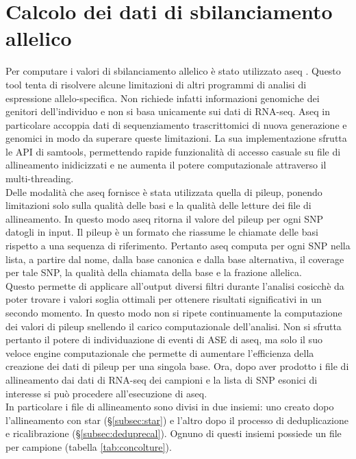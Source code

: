  \section{Calcolo dei dati di sbilanciamento allelico}
  \label{sec:aseq}
  Per computare i valori di sbilanciamento allelico \`e stato utilizzato aseq \cite{aseq}.
  Questo tool tenta di risolvere alcune limitazioni di altri programmi di analisi di espressione allelo-specifica.
  Non richiede infatti informazioni genomiche dei genitori dell'individuo e non si basa unicamente sui dati di RNA-seq.
  Aseq in particolare accoppia dati di sequenziamento trascrittomici di nuova generazione e genomici in modo da superare queste limitazioni.
  La sua implementazione sfrutta le API di samtools, permettendo rapide funzionalit\`a di accesso casuale su file di allineamento inidicizzati e ne aumenta il potere computazionale attraverso il multi-threading.\\
  Delle modalit\`a che aseq fornisce \`e stata utilizzata quella di pileup, ponendo limitazioni solo sulla qualit\`a delle basi e la qualit\`a delle letture dei file di allineamento.
  In questo modo aseq ritorna il valore del pileup per ogni SNP datogli in input.
  Il pileup \`e un formato che riassume le chiamate delle basi rispetto a una sequenza di riferimento.
  Pertanto aseq computa per ogni SNP nella lista, a partire dal nome, dalla base canonica e dalla base alternativa, il coverage per tale SNP, la qualit\`a della chiamata della base e la frazione allelica.\\
  Questo permette di applicare all'output diversi filtri durante l'analisi cosicch\`e da poter trovare i valori soglia ottimali per ottenere risultati significativi in un secondo momento.
  In questo modo non si ripete continuamente la computazione dei valori di pileup snellendo il carico computazionale dell'analisi.
  Non si sfrutta pertanto il potere di individuazione di eventi di ASE di aseq, ma solo il suo veloce engine computazionale che permette di aumentare l'efficienza della creazione dei dati di pileup per una singola base.
  Ora, dopo aver prodotto i file di allineamento dai dati di RNA-seq dei campioni e la lista di SNP esonici di interesse si pu\`o procedere all'esecuzione di aseq.\\
  In particolare i file di allineamento sono divisi in due insiemi: uno creato dopo l'allineamento con star (\S\ref{subsec:star}) e l'altro dopo il processo di deduplicazione e ricalibrazione (\S\ref{subsec:deduprecal}).
  Ognuno di questi insiemi possiede un file per campione (tabella \ref{tab:concolture}).

